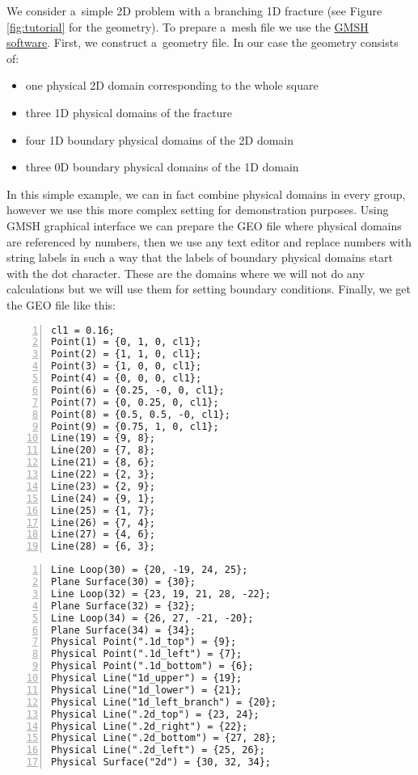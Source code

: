 \documentclass[12pt,a4paper]{report}
\begin{document}
We consider a~simple 2D problem with a branching 1D fracture (see Figure \ref{fig:tutorial} for the geometry). To prepare a~mesh file we use the \href{http://geuz.org/gmsh/}{GMSH software}.
First, we construct a~geometry file. In our case the geometry consists of: 
\begin{itemize}
 \item one physical 2D domain corresponding to the whole square
 \item three 1D physical domains of the fracture
 \item four 1D boundary physical domains of the 2D domain
 \item three 0D boundary physical domains of the 1D domain
\end{itemize}
In this simple example, we can in fact combine physical domains in every group, however we use this more complex setting for
demonstration purposes. Using GMSH graphical interface we can prepare the GEO file where physical domains are referenced by numbers, then we use 
any text editor and replace numbers with string labels in such a way that the labels of boundary physical domains start with the dot character. 
These are the domains where we will not do any calculations but we will use them for setting boundary conditions.
Finally, we get the GEO file like this:

\begin{multicols}{2}
{\small
\begin{Verbatim}[numbers=left]
cl1 = 0.16;
Point(1) = {0, 1, 0, cl1};
Point(2) = {1, 1, 0, cl1};
Point(3) = {1, 0, 0, cl1};
Point(4) = {0, 0, 0, cl1};
Point(6) = {0.25, -0, 0, cl1};
Point(7) = {0, 0.25, 0, cl1};
Point(8) = {0.5, 0.5, -0, cl1};
Point(9) = {0.75, 1, 0, cl1};
Line(19) = {9, 8};
Line(20) = {7, 8};
Line(21) = {8, 6};
Line(22) = {2, 3};
Line(23) = {2, 9};
Line(24) = {9, 1};
Line(25) = {1, 7};
Line(26) = {7, 4};
Line(27) = {4, 6};
Line(28) = {6, 3};
\end{Verbatim}
\columnbreak
\begin{Verbatim}[numbers=left, firstnumber=last]
Line Loop(30) = {20, -19, 24, 25};
Plane Surface(30) = {30};
Line Loop(32) = {23, 19, 21, 28, -22};
Plane Surface(32) = {32};
Line Loop(34) = {26, 27, -21, -20};
Plane Surface(34) = {34};
Physical Point(".1d_top") = {9};
Physical Point(".1d_left") = {7};
Physical Point(".1d_bottom") = {6};
Physical Line("1d_upper") = {19};
Physical Line("1d_lower") = {21};
Physical Line("1d_left_branch") = {20};
Physical Line(".2d_top") = {23, 24};
Physical Line(".2d_right") = {22};
Physical Line(".2d_bottom") = {27, 28};
Physical Line(".2d_left") = {25, 26};
Physical Surface("2d") = {30, 32, 34};
\end{Verbatim}
}
\end{multicols}
\end{document}
